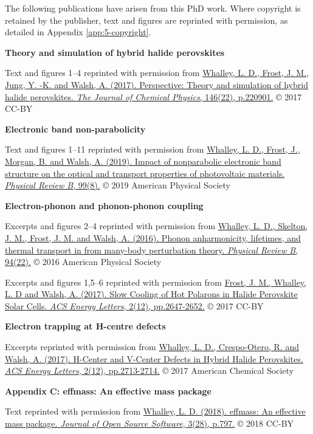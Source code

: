
The following publications have arisen from this PhD work. Where copyright is retained by the publisher, text and figures are reprinted with permission, as detailed in Appendix \ref{app:5-copyright}.

\vspace{\frontmatterbaselineskip}

\textbf{Theory and simulation of hybrid halide perovskites } 

Text and figures 1--4 reprinted with permission from
\href{https://doi.org/10.1063/1.4984964}{Whalley, L. D., Frost, J. M., Jung, Y. -K. and Walsh, A. (2017). Perspective: Theory and simulation of hybrid halide perovskites. \textit{The Journal of Chemical Physics}, 146(22), p.220901.} © 2017 CC-BY
\vspace{\frontmatterbaselineskip}

\textbf{Electronic band non-parabolicity}

Text and figures 1--11 reprinted with permission from
\href{https://doi.org/10.1103/PhysRevB.99.085207}{Whalley, L. D., Frost, J., Morgan, B. and Walsh, A. (2019). Impact of nonparabolic electronic band structure on the optical and transport properties of photovoltaic materials. \textit{Physical Review B}, 99(8).} © 2019 American Physical Society
\vspace{\frontmatterbaselineskip}

\textbf{Electron-phonon and phonon-phonon coupling}

Excerpts and figures 2--4 reprinted with permission from
\href{https://doi.org/10.1103/PhysRevB.94.220301}{Whalley, L. D., Skelton, J. M., Frost, J. M. and Walsh, A. (2016). Phonon anharmonicity, lifetimes, and thermal transport in  from many-body perturbation theory. \textit{Physical Review B}, 94(22).} © 2016 American Physical Society

Excerpts and figures 1,5--6 reprinted with permission from
\href{https://doi.org/10.1021/acsenergylett.7b00862}{Frost, J. M., Whalley, L. D and Walsh, A. (2017). Slow Cooling of Hot Polarons in Halide Perovskite Solar Cells. \textit{ACS Energy Letters}, 2(12), pp.2647-2652.} © 2017 CC-BY
\vspace{\frontmatterbaselineskip}

\textbf{Electron trapping at H-centre defects}

Excerpts reprinted with permission from
\href{https://doi.org/10.1021/acsenergylett.7b00995}{Whalley, L. D., Crespo-Otero, R. and Walsh, A. (2017). H-Center and V-Center Defects in Hybrid Halide Perovskites. \textit{ACS Energy Letters}, 2(12), pp.2713-2714.} © 2017 American Chemical Society 
\vspace{\frontmatterbaselineskip}

\textbf{Appendix C: effmass: An effective mass package}

Text reprinted with permission from
\href{https://doi.org/10.21105/joss.00797}{Whalley, L. D. (2018). effmass: An effective mass package. \textit{Journal of Open Source Software}, 3(28), p.797.} © 2018 CC-BY 


